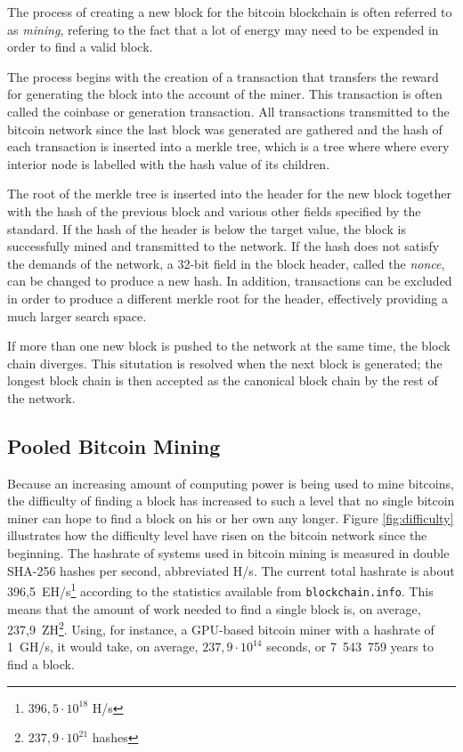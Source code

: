 The process of creating a new block for the bitcoin blockchain is often referred to as \textit{mining},
refering to the fact that a lot of energy may need to be expended in order to find a valid block.

The process begins with the creation of a transaction that transfers the reward for generating the block
into the account of the miner. This transaction is often called the coinbase or generation transaction.
All transactions transmitted to the bitcoin network since the last block was generated are gathered and
the hash of each transaction is inserted into a merkle tree, which is a tree where where every interior
node is labelled with the hash value of its children.

The root of the merkle tree is inserted into the header for the new block together with the hash of the
previous block and various other fields specified by the standard. If the hash of the header is below the
target value, the block is successfully mined and transmitted to the network. If the hash does not satisfy
the demands of the network, a 32-bit field in the block header, called the \textit{nonce}, can be changed
to produce a new hash. In addition, transactions can be excluded in order to produce a different merkle
root for the header, effectively providing a much larger search space.

If more than one new block is pushed to the network at the same time, the block chain diverges.
This situtation is resolved when the next block is generated; the longest block chain is then accepted
as the canonical block chain by the rest of the network. \cite{bitcoin}

\subsection{Pooled Bitcoin Mining}

Because an increasing amount of computing power is being used to mine bitcoins, the difficulty of finding
a block has increased to such a level that no single bitcoin miner can hope to find a block on his or her
own any longer. Figure \ref{fig:difficulty} illustrates how the difficulty level have risen on the bitcoin network
since the beginning. The hashrate of systems used in bitcoin mining is measured in double SHA-256 hashes per second,
abbreviated H/s. The current total hashrate is about 396,5~EH/s\footnote{$396,5\cdot 10^{18}$ H/s} according to the
statistics available from \texttt{blockchain.info}. This means that the amount of work needed to find a single block is,
on average, 237,9~ZH\footnote{$237,9\cdot 10^{21}$ hashes}. Using, for instance, a GPU-based bitcoin miner with a
hashrate of 1~GH/s, it would take, on average, $237,9\cdot 10^{14}$ seconds, or 7~543~759 years to find a block.

